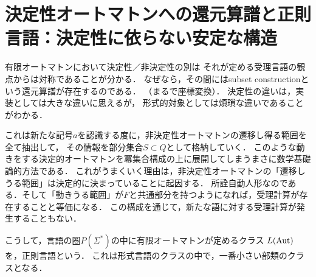\documentclass[uplatex, dvipdfmx]{jsreport}
\begin{document}
\section{決定性オートマトンへの還元算譜と正則言語：決定性に依らない安定な構造}

\begin{tcolorbox}[colframe=ForestGreen, colback=ForestGreen!10!white, breakable,
    title=NFAとDFA]
    有限オートマトンにおいて決定性／非決定性の別は
    それが定める受理言語の観点からは対称であることが分かる．
    なぜなら，その間にはsubset constructionという還元算譜が存在するのである．
    （まるで座標変換）．
    決定性の違いは，実装としては大きな違いに思えるが，
    形式的対象としては煩瑣な違いであることがわかる．

    これは新たな記号$a$を認識する度に，非決定性オートマトンの遷移し得る範囲を全て抽出して，
    その情報を部分集合$S\subset Q$として格納していく．
    このような動きをする決定的オートマトンを冪集合構成の上に展開してしまうまさに数学基礎論的方法である．
    これがうまくいく理由は，非決定性オートマトンの「遷移しうる範囲」は決定的に決まっていることに起因する．
    所詮自動人形なのである．そして「動きうる範囲」が$F$と共通部分を持つようになれば，受理計算が存在することと等価になる．
    この構成を通じて，新たな語に対する受理計算が発生することもない．

    こうして，言語の圏$P(\Sigma^*)$の中に有限オートマトンが定めるクラス
    $L(\mathrm{Aut})$を，正則言語という．
    これは形式言語のクラスの中で，一番小さい部類のクラスとなる．
\end{tcolorbox}
\end{document}
